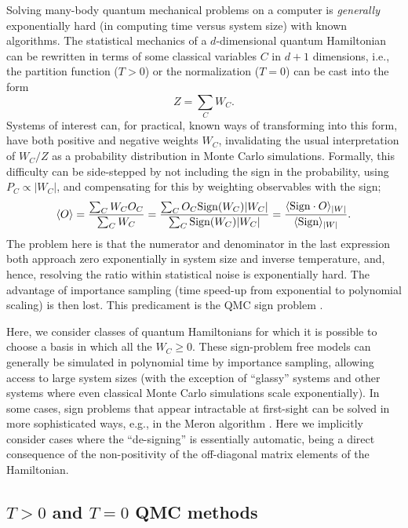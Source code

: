 \documentclass[10pt,pre,aps,twocolumn,showpacs,subscriptaddresses,floatfix]{revtex4}
\begin{document}
Solving many-body quantum mechanical problems on a computer is {\em generally} exponentially hard (in computing time versus system size) 
with known algorithms. The statistical mechanics of a $d$-dimensional quantum Hamiltonian can be rewritten in terms of some classical variables 
$C$ in $d+1$ dimensions, i.e., the partition function ($T>0$) or the normalization ($T=0$) can be cast into the form
\begin{equation}
\label{eq:wc}
Z=\sum_C W_C.
\end{equation}
Systems of interest can, for practical, known ways of transforming into this form, have both positive and negative weights $W_C$, 
invalidating the usual interpretation of $W_C/Z$ as a probability distribution in Monte Carlo simulations. Formally, this difficulty 
can be side-stepped by not including the sign in the probability, using $P_C \propto |W_C|$, and compensating for this by weighting 
observables with the sign;
\begin{equation}
\langle O \rangle = \frac{\sum_C W_C O_C}{\sum_C W_C} =
\frac{\sum_C O_C {\rm Sign}(W_C) |W_C|}{\sum_C {\rm Sign}(W_C)|W_C|} = 
\frac{\langle {\rm Sign} \cdot O\rangle_{|W|}}{\langle {\rm Sign}\rangle_{|W|}}.
\label{expvalue}
\end{equation}
The problem here is that the numerator and denominator in the last expression both approach zero
exponentially in system size and inverse temperature, and, hence, resolving the ratio within 
statistical noise is exponentially hard. The advantage of importance sampling (time speed-up from exponential 
to polynomial scaling) is then lost. This predicament is the QMC sign problem \cite{Loh90,Henelius00,Nyfeler08}.

Here, we consider classes of quantum Hamiltonians for which it is possible to choose a basis in which all the $W_C\geq 0$. 
These sign-problem free models can generally be simulated in polynomial time by 
importance sampling, allowing access to large system sizes (with the exception of ``glassy'' systems and
other systems where even classical Monte Carlo simulations scale exponentially). In some cases, sign problems that
appear intractable at first-sight can be solved in more sophisticated ways, e.g., in the Meron algorithm \cite{Chandrasekharan99}. 
Here we implicitly consider cases where the ``de-signing'' is essentially automatic, being a direct consequence of the non-positivity of the  
off-diagonal matrix elements of the Hamiltonian.
 
\subsection{$T>0$ and $T=0$ QMC methods}
\label{ss:method}
\end{document}

